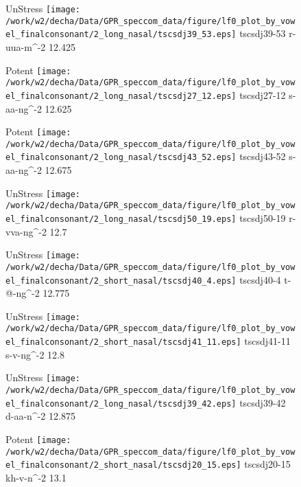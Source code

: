 \documentclass{article}
\begin{document}
\begin{figure}[t]
\begin{minipage}[b]{.24\textwidth}
UnStress
\centering
\texttt{[image: /work/w2/decha/Data/GPR\_speccom\_data/figure/lf0\_plot\_by\_vowel\_finalconsonant/2\_long\_nasal/tscsdj39\_53.eps]}
tscsdj39-53 r-uua-m\textasciicircum-2 12.425
\end{minipage}
\begin{minipage}[b]{.24\textwidth}
\colorbox{Apricot}{Potent}
\centering
\texttt{[image: /work/w2/decha/Data/GPR\_speccom\_data/figure/lf0\_plot\_by\_vowel\_finalconsonant/2\_long\_nasal/tscsdj27\_12.eps]}
tscsdj27-12 s-aa-ng\textasciicircum-2 12.625
\end{minipage}
\begin{minipage}[b]{.24\textwidth}
\colorbox{Apricot}{Potent}
\centering
\texttt{[image: /work/w2/decha/Data/GPR\_speccom\_data/figure/lf0\_plot\_by\_vowel\_finalconsonant/2\_long\_nasal/tscsdj43\_52.eps]}
tscsdj43-52 s-aa-ng\textasciicircum-2 12.675
\end{minipage}
\begin{minipage}[b]{.24\textwidth}
UnStress
\centering
\texttt{[image: /work/w2/decha/Data/GPR\_speccom\_data/figure/lf0\_plot\_by\_vowel\_finalconsonant/2\_long\_nasal/tscsdj50\_19.eps]}
tscsdj50-19 r-vva-ng\textasciicircum-2 12.7
\end{minipage}
\end{figure}

\begin{figure}[t]
\begin{minipage}[b]{.24\textwidth}
UnStress
\centering
\texttt{[image: /work/w2/decha/Data/GPR\_speccom\_data/figure/lf0\_plot\_by\_vowel\_finalconsonant/2\_short\_nasal/tscsdj40\_4.eps]}
tscsdj40-4 t-@-ng\textasciicircum-2 12.775
\end{minipage}
\begin{minipage}[b]{.24\textwidth}
UnStress
\centering
\texttt{[image: /work/w2/decha/Data/GPR\_speccom\_data/figure/lf0\_plot\_by\_vowel\_finalconsonant/2\_short\_nasal/tscsdj41\_11.eps]}
tscsdj41-11 s-v-ng\textasciicircum-2 12.8
\end{minipage}
\begin{minipage}[b]{.24\textwidth}
UnStress
\centering
\texttt{[image: /work/w2/decha/Data/GPR\_speccom\_data/figure/lf0\_plot\_by\_vowel\_finalconsonant/2\_long\_nasal/tscsdj39\_42.eps]}
tscsdj39-42 d-aa-n\textasciicircum-2 12.875
\end{minipage}
\begin{minipage}[b]{.24\textwidth}
\colorbox{Apricot}{Potent}
\centering
\texttt{[image: /work/w2/decha/Data/GPR\_speccom\_data/figure/lf0\_plot\_by\_vowel\_finalconsonant/2\_short\_nasal/tscsdj20\_15.eps]}
tscsdj20-15 kh-v-n\textasciicircum-2 13.1
\end{minipage}
\end{figure}
\end{document}
